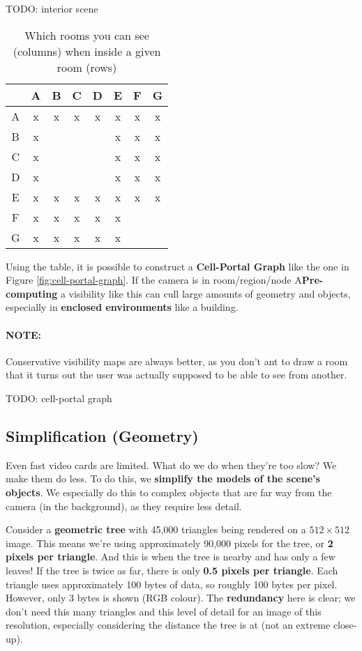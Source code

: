 \documentclass{article}
\begin{document}
TODO: interior scene 

\begin{table}
	\centering
	\begin{tabular}{|c|c|c|c|c|c|c|c|}
		\hline
		& A & B & C & D & E & F & G \\
		\hline
		A & x & x & x & x & x & x & x \\
		B & x & & & & x & x & x \\
		C & x & & & & x & x & x \\
		D & x & & & & x & x & x \\
		E & x & x & x & x & x & x & x \\
		F & x & x & x & x & x & & \\						
		G & x & x & x & x & x & & \\		
		\hline
	\end{tabular}
	\caption{Which rooms you can see (columns) when inside a given room (rows)}
	\label{tab:cell-portal-graph}
\end{table}

Using the table, it is possible to construct a \textbf{Cell-Portal Graph} like the one in Figure \ref{fig:cell-portal-graph}. If the camera is in room/region/node A\textbf{Pre-computing} a visibility like this can cull large amounts of geometry and objects, especially in \textbf{enclosed environments} like a building.

\paragraph{\textbf{NOTE: }} Conservative visibility maps are always better, as you don't ant to draw a room that it turns out the user was actually supposed to be able to see from another.

TODO: cell-portal graph

\subsection{Simplification (Geometry)}

Even fast video cards are limited. What do we do when they're too slow? We make them do less. To do this, we \textbf{simplify the models of the scene's objects}. We especially do this to complex objects that are far way from the camera (in the background), as they require less detail.

Consider a \textbf{geometric tree} with 45,000 triangles being rendered on a $512 \times 512$ image. This means we're using approximately 90,000 pixels for the tree, or \textbf{2 pixels per triangle}.  And this is when the tree is nearby and has only a few leaves! If the tree is twice as far, there is only \textbf{0.5 pixels per triangle}. Each triangle uses approximately 100 bytes of data, so roughly 100 bytes per pixel. However, only 3 bytes is shown (RGB colour). The \textbf{redundancy} here is clear; we don't need this many triangles and this level of detail for an image of this resolution, especially considering the distance the tree is at (not an extreme close-up).
\end{document}

